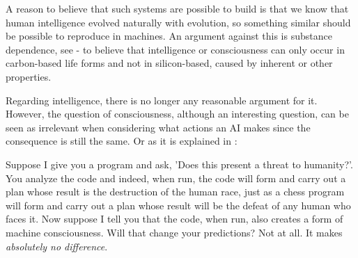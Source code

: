 \documentclass[12pt,A4]{report}
\newcommand{\autobaj}{}
\theoremstyle{definition}
\begin{document}
A reason to believe that such systems are possible to build is that we know that human intelligence evolved naturally with evolution, so something similar should be possible to reproduce in machines. An argument against this is substance dependence, see \citet{Bostrom03} - to believe that intelligence or consciousness can only occur in carbon-based life forms and not in silicon-based, caused by inherent or other properties. 


Regarding intelligence, there is no longer any reasonable argument for it. However, the question of consciousness, although an interesting question, can be seen as irrelevant when considering what actions an AI makes since the consequence is still the same. Or as it is explained in \citet[p.22]{HumanCompatible}: 
\begin{displayquote}
  Suppose I give you a program and ask, 'Does this present a threat to humanity?'. You analyze the code and indeed, when run, the code will form and carry out a plan whose result is the destruction of the human race, just as a chess program will form and carry out a plan whose result will be the defeat of any human who faces it. Now suppose I tell you that the code, when run, also creates a form of machine consciousness. Will that change your predictions? Not at all. It makes \textit{absolutely no difference}.
\end{displayquote}
\end{document}
